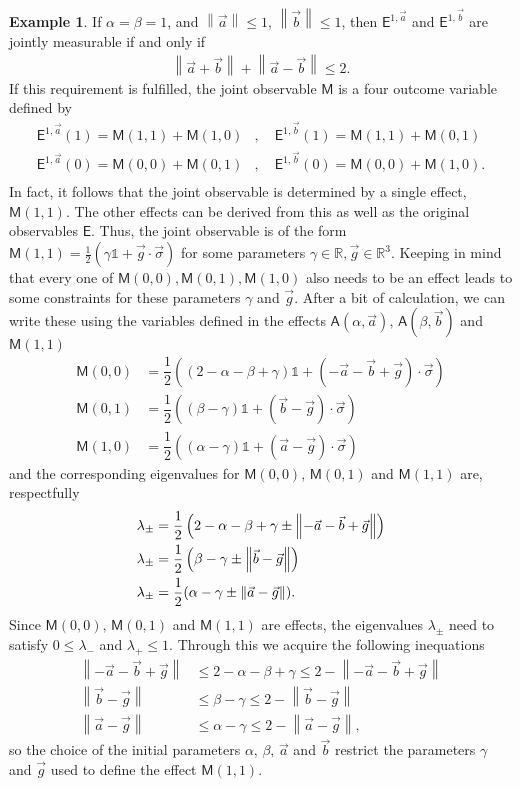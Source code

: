 \documentclass[a4paper,12pt]{wihuri}
\theoremstyle{definition}
\newtheorem{example}{Example}
\numberwithin{definition}{section}
\numberwithin{example}{section}
\numberwithin{theorem}{section}
\numberwithin{proposition}{section}
\numberwithin{lemma}{section}
\newcommand{\A}{\mathsf{A}}%
\newcommand{\M}{\mathsf{M}}%
\newcommand{\E}{\mathsf{E}}%
\newcommand{\id}{\mathds{1}}
\newcommand{\real}{\mathbb{R}}%
\newcommand{\norm}[1]{\left\lVert#1\right\rVert}
\begin{document}
\begin{example}
If $\alpha = \beta = 1$, and $\norm{\vec{a}}\leq 1,\, \norm{\vec{b}}\leq 1$, then $\E^{1, \vec{a}}$ and $\E^{1, \vec{b}}$ are jointly measurable if and only if 
\begin{align*}
\norm{\vec{a}+\vec{b}} + \norm{\vec{a} - \vec{b}} \leq 2\text{.}
\end{align*}
If this requirement is fulfilled, the joint observable $\M$ is a four outcome variable defined by 
\begin{align*}
\E^{1, \vec{a}}(1) = \M(1,1) + \M(1,0) &,\quad \E^{1, \vec{b}}(1) = \M(1,1) + \M(0,1) \\
\E^{1, \vec{a}}(0) = \M(0,0) + \M(0,1) &,\quad \E^{1, \vec{b}}(0) = \M(0,0) + \M(1,0)\text{.} \\
\end{align*}
In fact, it follows that the joint observable is determined by a single effect, $\M(1,1)$. The other effects can be derived from this as well as the original observables $\E$. Thus, the joint observable is of the form $\M(1,1) = \frac{1}{2}(\gamma\id + \vec{g}\cdot\vec{\sigma})$ for some parameters $\gamma \in \real, \vec{g} \in \real^3$. Keeping in mind that every one of $\M(0,0), \M(0,1), \M(1,0)$ also needs to be an effect leads to some constraints for these parameters $\gamma$ and $\vec{g}$. After a bit of calculation, we can write these using the variables defined in the effects $\A(\alpha,\vec{a}),\,\A(\beta,\vec{b})$ and $\M(1,1)$
\begin{align*}
\M(0,0) &= \dfrac{1}{2}\left((2-\alpha-\beta+\gamma)\id + (-\vec{a}-\vec{b}+\vec{g})\cdot\vec{\sigma} \right)\\
\M(0,1) &= \dfrac{1}{2}\left((\beta-\gamma)\id + (\vec{b}-\vec{g})\cdot\vec{\sigma} \right)\\
\M(1,0) &= \dfrac{1}{2}\left( (\alpha-\gamma)\id + (\vec{a}-\vec{g})\cdot\vec{\sigma} \right)
\end{align*}
and the corresponding eigenvalues for $\M(0,0),\,\M(0,1)$ and $\M(1,1)$ are, respectfully
\begin{align*}
\lambda_{\pm} &= \dfrac{1}{2}\left(2-\alpha-\beta+\gamma \pm \norm{-\vec{a}-\vec{b}+\vec{g}}\right)\\
\lambda_{\pm} &= \dfrac{1}{2}\left(\beta-\gamma \pm \norm{\vec{b}-\vec{g}}\right)\\
\lambda_{\pm} &= \dfrac{1}{2}(\alpha-\gamma \pm \norm{\vec{a}-\vec{g}})\text.
\end{align*}
Since $\M(0,0),\,\M(0,1)$ and $\M(1,1)$ are effects, the eigenvalues $\lambda_{\pm}$ need to satisfy $0 \leq \lambda_{-}$ and $\lambda_{+} \leq 1$. Through this we acquire the following inequations
\begin{align*}
\norm{-\vec{a}-\vec{b}+\vec{g}} &\leq 2-\alpha-\beta+\gamma \leq 2-\norm{-\vec{a}-\vec{b}+\vec{g}}\\
\norm{\vec{b}-\vec{g}} &\leq \beta-\gamma \leq 2-\norm{\vec{b}-\vec{g}}\\
\norm{\vec{a}-\vec{g}} &\leq \alpha-\gamma \leq 2-\norm{\vec{a}-\vec{g}},
\end{align*}
so the choice of the initial parameters $\alpha,\,\beta,\,\vec{a}$ and $\vec{b}$ restrict the parameters $\gamma$ and $\vec{g}$ used to define the effect $\M(1,1)$.


\end{example}
\end{document}
